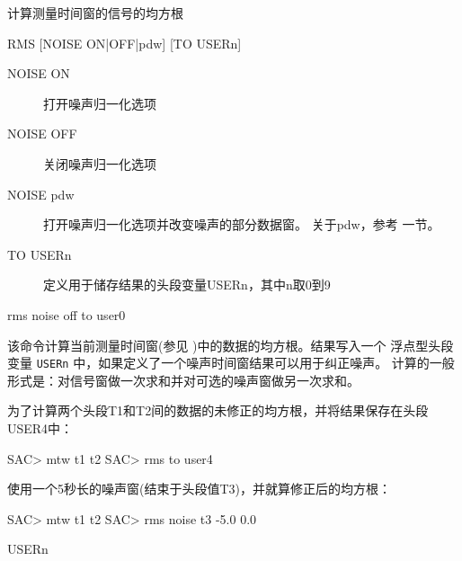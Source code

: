 \label{cmd:rms}

计算测量时间窗的信号的均方根

\begin{SACSTX}
RMS [NOISE ON|OFF|pdw] [TO USERn]
\end{SACSTX}

\begin{description}
\item [NOISE ON] 打开噪声归一化选项
\item [NOISE OFF] 关闭噪声归一化选项
\item [NOISE pdw] 打开噪声归一化选项并改变噪声的部分数据窗。
    关于pdw，参考  一节。
\item [TO USERn] 定义用于储存结果的头段变量USERn，其中n取0到9
\end{description}

\begin{SACDFT}
rms noise off to user0
\end{SACDFT}

该命令计算当前测量时间窗(参见 )中的数据的均方根。结果写入一个
浮点型头段变量 \texttt{USERn} 中，如果定义了一个噪声时间窗结果可以用于纠正噪声。
计算的一般形式是：对信号窗做一次求和并对可选的噪声窗做另一次求和。

为了计算两个头段T1和T2间的数据的未修正的均方根，并将结果保存在头段USER4中：
\begin{SACCode}
SAC> mtw t1 t2
SAC> rms to user4
\end{SACCode}

使用一个5秒长的噪声窗(结束于头段值T3)，并就算修正后的均方根：
\begin{SACCode}
SAC> mtw t1 t2
SAC> rms noise t3 -5.0 0.0
\end{SACCode}

USERn
